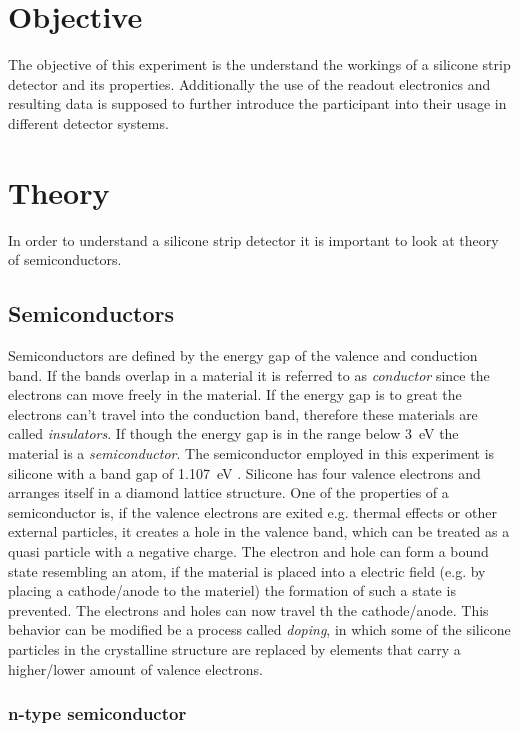 \section{Objective}
\label{sec:Obj}
The objective of this experiment is the understand the workings of a silicone strip detector and its properties. Additionally the use of the readout electronics and resulting data is supposed to further introduce the participant into their usage in different detector systems.
\section{Theory}
\label{sec:Theo}

In order to understand a silicone strip detector it is important to look at theory of semiconductors.
\subsection{Semiconductors}
Semiconductors are defined by the energy gap of the valence and conduction band. If the bands overlap in a material it is referred to as \textit{conductor} since the electrons can move freely in the material. If the energy gap is to great the electrons can't travel into the conduction band, therefore these materials are called \textit{insulators}. If though the energy gap is in the range below \qty{3}{\eV} the material is a \textit{semiconductor}. The semiconductor employed in this experiment is silicone with a band gap of \qty{1.107}{\eV} \cite{lab}. Silicone has four valence electrons and arranges itself in a diamond lattice structure. One of the properties of a semiconductor is, if the valence electrons are exited e.g. thermal effects or other external particles, it creates a hole in the valence band, which can be treated as a quasi particle with a negative charge. The electron and hole can form a bound state resembling an atom, if the material is placed into a electric field (e.g. by placing a cathode/anode to the materiel) the formation of such a state is prevented. The electrons and holes can now travel th the cathode/anode. This behavior can be modified be a process called \textit{doping}, in which some of the silicone particles in the crystalline structure are replaced by elements that carry a higher/lower amount of valence electrons. %

\subsubsection{n-type semiconductor}

